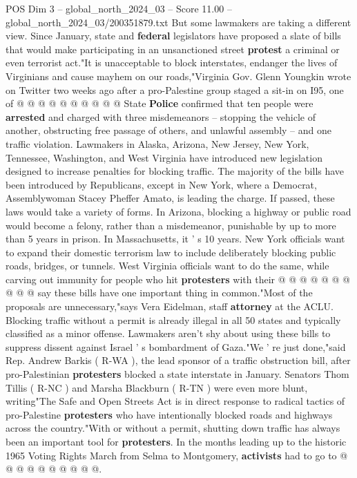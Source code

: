 \begin{textsample}{POS Dim 3 – global\_north\_2024\_03 – Score 11.00 – global\_north\_2024\_03/200351879.txt}
But some lawmakers are taking a different view.
Since January, state and \textbf{federal} legislators have proposed a slate of bills that would make participating in an unsanctioned street \textbf{protest} a criminal or even terrorist act."It is unacceptable to block interstates, endanger the lives of Virginians and cause mayhem on our roads,"Virginia Gov.
Glenn Youngkin wrote on Twitter two weeks ago after a pro-Palestine group staged a sit-in on I95, one of @ @ @ @ @ @ @ @ @ @ State \textbf{Police} confirmed that ten people were \textbf{arrested} and charged with three misdemeanors -- stopping the vehicle of another, obstructing free passage of others, and unlawful assembly -- and one traffic violation.
Lawmakers in Alaska, Arizona, New Jersey, New York, Tennessee, Washington, and West Virginia have introduced new legislation designed to increase penalties for blocking traffic.
The majority of the bills have been introduced by Republicans, except in New York, where a Democrat, Assemblywoman Stacey Pheffer Amato, is leading the charge.
If passed, these laws would take a variety of forms.
In Arizona, blocking a highway or public road would become a felony, rather than a misdemeanor, punishable by up to more than 5 years in prison.
In Massachusetts, it ' s 10 years.
New York officials want to expand their domestic terrorism law to include deliberately blocking public roads, bridges, or tunnels.
West Virginia officials want to do the same, while carving out immunity for people who hit \textbf{protesters} with their @ @ @ @ @ @ @ @ @ @ say these bills have one important thing in common."Most of the proposals are unnecessary,"says Vera Eidelman, staff \textbf{attorney} at the ACLU.
Blocking traffic without a permit is already illegal in all 50 states and typically classified as a minor offense.
Lawmakers aren't shy about using these bills to suppress dissent against Israel ' s bombardment of Gaza."We ' re just done,"said Rep.
Andrew Barkis ( R-WA ), the lead sponsor of a traffic obstruction bill, after pro-Palestinian \textbf{protesters} blocked a state interstate in January.
Senators Thom Tillis ( R-NC ) and Marsha Blackburn ( R-TN ) were even more blunt, writing"The Safe and Open Streets Act is in direct response to radical tactics of pro-Palestine \textbf{protesters} who have intentionally blocked roads and highways across the country."With or without a permit, shutting down traffic has always been an important tool for \textbf{protesters}.
In the months leading up to the historic 1965 Voting Rights March from Selma to Montgomery, \textbf{activists} had to go to @ @ @ @ @ @ @ @ @ @.

\end{textsample}
